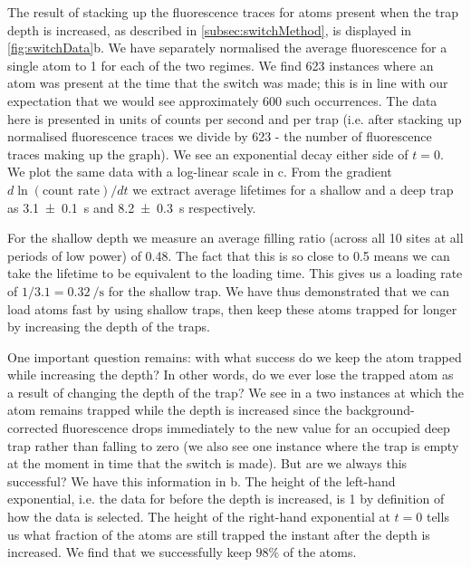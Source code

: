 \documentclass[../Thesis-IJspeert.tex]{subfiles}
\begin{document}
\iffalse
The result of stacking up the fluorescence traces for atoms present when the trap depth is increased, as described in \cref{subsec:switchMethod}, is displayed in \cref{fig:switchData}b. We have separately normalised the average fluorescence for a single atom to \num{1} for each of the two regimes. We find \num{623} instances where an atom was present at the time that the switch was made; this is in line with our expectation that we would see approximately \num{600} such occurrences. The data here is presented in units of counts per second and per trap (i.e. after stacking up normalised fluorescence traces we divide by \num{623} - the number of fluorescence traces making up the graph). We see an exponential decay either side of $t=0$. We plot the same data with a log-linear scale in \cite{fig:switchData}c. From the gradient $d\ln(\mathrm{count\,\,rate})/dt$ we extract average lifetimes for a shallow and a deep trap as \SI{3.1\pm0.1}{\s} and \SI{8.2\pm0.3}{\s} respectively. 

For the shallow depth we measure an average filling ratio (across all \num{10} sites at all periods of low power) of \num{0.48}. The fact that this is so close to \num{0.5} means we can take the lifetime to be equivalent to the loading time. This gives us a loading rate of $1/3.1 = \SI{0.32}{\per\second}$ for the shallow trap. We have thus demonstrated that we can load atoms fast by using shallow traps, then keep these atoms trapped for longer by increasing the depth of the traps. 

One important question remains: with what success do we keep the atom trapped while increasing the depth? In other words, do we ever lose the trapped atom as a result of changing the depth of the trap? We see in \cite{fig:switchData}a two instances at which the atom remains trapped while the depth is increased since the background-corrected fluorescence drops immediately to the new value for an occupied deep trap rather than falling to zero (we also see one instance where the trap is empty at the moment in time that the switch is made). But are we always this successful? We have this information in \cite{fig:switchData}b. The height of the left-hand exponential, i.e. the data for before the depth is increased, is \num{1} by definition of how the data is selected. The height of the right-hand exponential at $t=0$ tells us what fraction of the atoms are still trapped the instant after the depth is increased. We find that we successfully keep $98\%$ of the atoms.
\end{document}
